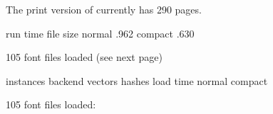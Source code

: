 \stoptitle

\starttitle[title=Compact mode]

The print version of  currently has 290 pages.

\blank[big]

\starttabulate[|l|c|c|]
\HL
    \NC         \NC run time \NC file size \NC \NR
\HL
    \NC normal       .962 \NC \NR
    \NC compact      .630 \NC \NR
\HL
\stoptabulate

\blank[big]

105 font files loaded (see next page)

\blank[big]

\starttabulate[|l|c|c|c|c|c|]
\HL
\NC         \NC instances \NC backend \NC vectors \NC hashes \NC load time   \NC \NR
\HL
\NC normal                                                 \NC \NR
\NC compact                                                \NC \NR
\HL
\stoptabulate

\page

105 font files loaded:

